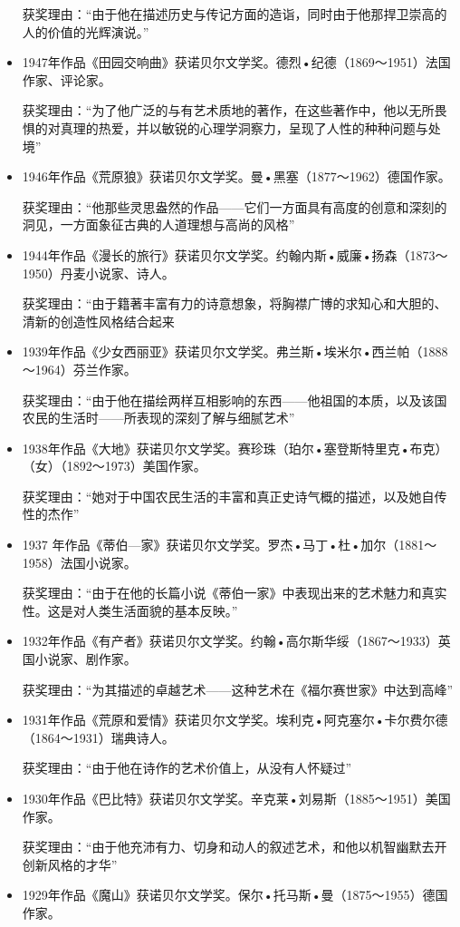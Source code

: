 \documentclass[UTF8,a4paper,8pt]{ctexart}
\begin{document}
\begin{itemize}
			获奖理由：“由于他在描述历史与传记方面的造诣，同时由于他那捍卫崇高的人的价值的光辉演说。”
			\item 1947年作品《田园交响曲》获诺贝尔文学奖。德烈•纪德（1869～1951）法国作家、评论家。
			
			获奖理由：“为了他广泛的与有艺术质地的著作，在这些著作中，他以无所畏惧的对真理的热爱，并以敏锐的心理学洞察力，呈现了人性的种种问题与处境”
			\item 1946年作品《荒原狼》获诺贝尔文学奖。曼•黑塞（1877～1962）德国作家。
			
			获奖理由：“他那些灵思盎然的作品——它们一方面具有高度的创意和深刻的洞见，一方面象征古典的人道理想与高尚的风格”
			\item 1944年作品《漫长的旅行》获诺贝尔文学奖。约翰内斯•威廉•扬森（1873～1950）丹麦小说家、诗人。
			
			获奖理由：“由于籍著丰富有力的诗意想象，将胸襟广博的求知心和大胆的、清新的创造性风格结合起来
			\item 1939年作品《少女西丽亚》获诺贝尔文学奖。弗兰斯•埃米尔•西兰帕（1888～1964）芬兰作家。
			
			获奖理由：“由于他在描绘两样互相影响的东西——他祖国的本质，以及该国农民的生活时——所表现的深刻了解与细腻艺术”
			\item 1938年作品《大地》获诺贝尔文学奖。赛珍珠（珀尔•塞登斯特里克•布克）（女）（1892～1973）美国作家。
			
			获奖理由：“她对于中国农民生活的丰富和真正史诗气概的描述，以及她自传性的杰作”
			\item 1937 年作品《蒂伯—家》获诺贝尔文学奖。罗杰•马丁•杜•加尔（1881～1958）法国小说家。
			
			获奖理由：“由于在他的长篇小说《蒂伯一家》中表现出来的艺术魅力和真实性。这是对人类生活面貌的基本反映。”
			\item 1932年作品《有产者》获诺贝尔文学奖。约翰•高尔斯华绥（1867～1933）英国小说家、剧作家。
			
			获奖理由：“为其描述的卓越艺术——这种艺术在《福尔赛世家》中达到高峰”
			\item 1931年作品《荒原和爱情》获诺贝尔文学奖。埃利克•阿克塞尔•卡尔费尔德（1864～1931）瑞典诗人。
			
			获奖理由：“由于他在诗作的艺术价值上，从没有人怀疑过”
			\item 1930年作品《巴比特》获诺贝尔文学奖。辛克莱•刘易斯（1885～1951）美国作家。
			
			获奖理由：“由于他充沛有力、切身和动人的叙述艺术，和他以机智幽默去开创新风格的才华”
			\item 1929年作品《魔山》获诺贝尔文学奖。保尔•托马斯•曼（1875～1955）德国作家。
			

\end{itemize}
\end{document}
